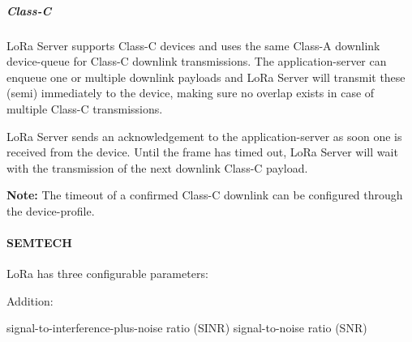 
\subparagraph{Class-C}

LoRa Server supports Class-C devices and uses the same Class-A downlink device-queue for Class-C downlink transmissions.
The application-server can enqueue one or multiple downlink payloads and LoRa Server will transmit these (semi) immediately to the device,
	making sure no overlap exists in case of multiple Class-C transmissions.

LoRa Server sends an acknowledgement to the application-server as soon one is received from the device.
Until the frame has timed out,
	LoRa Server will wait with the transmission of the next downlink Class-C payload.

\textbf{Note:} The timeout of a confirmed Class-C downlink can be configured through the device-profile.




\paragraph{SEMTECH}



LoRa has three configurable parameters:

Addition:

signal-to-interference-plus-noise ratio (SINR)
signal-to-noise ratio (SNR)


